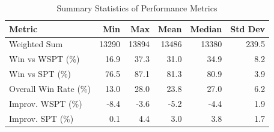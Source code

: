 \begin{table}[htbp]%
\centering%
\begin{tabular}{lrrrrr}%
\toprule%
\textbf{Metric}&\textbf{Min}&\textbf{Max}&\textbf{Mean}&\textbf{Median}&\textbf{Std Dev}\\%
\midrule%
Weighted Sum&13290&13894&13486&13380&239.5\\%
Win vs WSPT (\%)&16.9&37.3&31.0&34.9&8.2\\%
Win vs SPT (\%)&76.5&87.1&81.3&80.9&3.9\\%
Overall Win Rate (\%)&13.0&28.0&23.8&27.0&6.2\\%
Improv. WSPT (\%)&-8.4&-3.6&-5.2&-4.4&1.9\\%
Improv. SPT (\%)&0.1&4.4&3.0&3.8&1.7\\%
\bottomrule%
\end{tabular}%
\caption{Summary Statistics of Performance Metrics}%
\label{tab:metrics}%
\end{table}